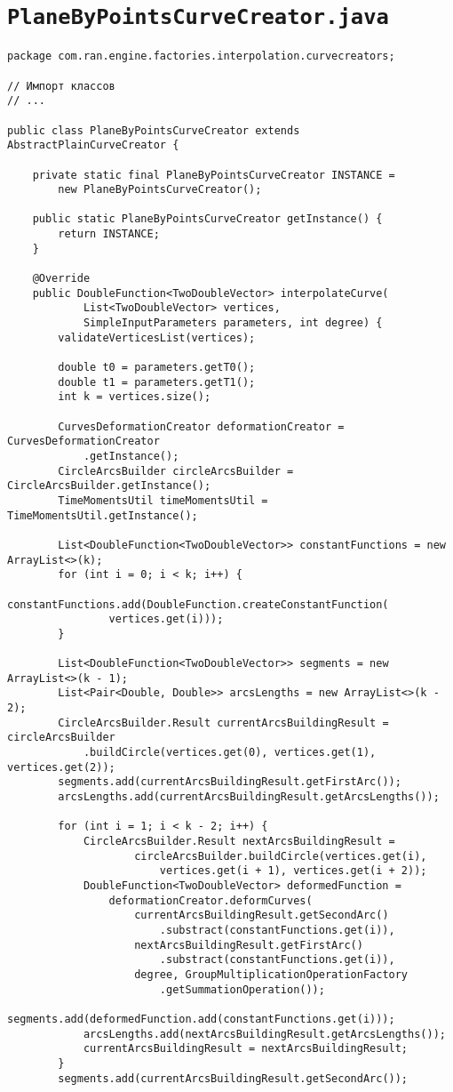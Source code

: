 \section*{\texttt{PlaneByPointsCurveCreator.java}}
\begin{verbatim}
package com.ran.engine.factories.interpolation.curvecreators;

// Импорт классов
// ...

public class PlaneByPointsCurveCreator extends AbstractPlainCurveCreator {

    private static final PlaneByPointsCurveCreator INSTANCE =
        new PlaneByPointsCurveCreator();

    public static PlaneByPointsCurveCreator getInstance() {
        return INSTANCE;
    }

    @Override
    public DoubleFunction<TwoDoubleVector> interpolateCurve(
            List<TwoDoubleVector> vertices,
            SimpleInputParameters parameters, int degree) {
        validateVerticesList(vertices);

        double t0 = parameters.getT0();
        double t1 = parameters.getT1();
        int k = vertices.size();

        CurvesDeformationCreator deformationCreator = CurvesDeformationCreator
            .getInstance();
        CircleArcsBuilder circleArcsBuilder = CircleArcsBuilder.getInstance();
        TimeMomentsUtil timeMomentsUtil = TimeMomentsUtil.getInstance();

        List<DoubleFunction<TwoDoubleVector>> constantFunctions = new ArrayList<>(k);
        for (int i = 0; i < k; i++) {
            constantFunctions.add(DoubleFunction.createConstantFunction(
                vertices.get(i)));
        }

        List<DoubleFunction<TwoDoubleVector>> segments = new ArrayList<>(k - 1);
        List<Pair<Double, Double>> arcsLengths = new ArrayList<>(k - 2);
        CircleArcsBuilder.Result currentArcsBuildingResult = circleArcsBuilder
            .buildCircle(vertices.get(0), vertices.get(1), vertices.get(2));
        segments.add(currentArcsBuildingResult.getFirstArc());
        arcsLengths.add(currentArcsBuildingResult.getArcsLengths());

        for (int i = 1; i < k - 2; i++) {
            CircleArcsBuilder.Result nextArcsBuildingResult =
                    circleArcsBuilder.buildCircle(vertices.get(i),
                        vertices.get(i + 1), vertices.get(i + 2));
            DoubleFunction<TwoDoubleVector> deformedFunction =
                deformationCreator.deformCurves(
                    currentArcsBuildingResult.getSecondArc()
                        .substract(constantFunctions.get(i)),
                    nextArcsBuildingResult.getFirstArc()
                        .substract(constantFunctions.get(i)),
                    degree, GroupMultiplicationOperationFactory
                        .getSummationOperation());
            segments.add(deformedFunction.add(constantFunctions.get(i)));
            arcsLengths.add(nextArcsBuildingResult.getArcsLengths());
            currentArcsBuildingResult = nextArcsBuildingResult;
        }
        segments.add(currentArcsBuildingResult.getSecondArc());


\end{verbatim}
